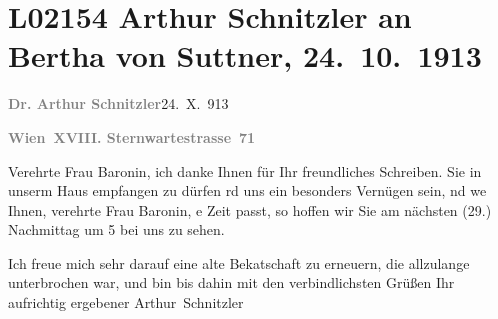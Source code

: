 

\section[Arthur Schnitzler an Bertha von Suttner, 24. 10. 1913]{L02154 Arthur Schnitzler an Bertha von Suttner, 24. 10. 1913}
\nopagebreak{}
\rehead{ }\normalsize\beginnumbering{}
\toendnotes[C]{\smallbreak\pagebreak[2]}
\toendnotes[C]{\smallbreak}
\pstart
           {\pb}\textcolor{gray}{\textbf{Dr. Arthur Schnitzler}}\hfill 24. X. 913\pend
           
\pstart
           \textcolor{gray}{\textbf{Wien XVIII. Sternwartestrasse 71}}\pend
           
\pstart{}Verehrte Frau Baronin,\pend\vspace{0.5em}
\pstart
           ich danke Ihnen für Ihr freundliches Schreiben. Sie in unserm Haus empfangen zu
               dürfen rd uns ein besonders Vernügen sein, nd we{\geminationn} Ihnen, verehrte Frau Baronin, e Zeit passt, so hoffen wir Sie {\pb}am \introOben{}nächsten\introOben{}{ }\label{K_L02154-1v}\label{K_L02154-1}{ }\introOben{}(29.)\introOben{} Nachmittag um 5 bei uns zu
               sehen.\pend
           
\pstart
           Ich freue mich sehr darauf eine alte Beka{\geminationn}tschaft zu
               erneuern, die allzulange unterbrochen war, und bin bis dahin mit den verbindlichsten
               Grüßen Ihr aufrichtig ergebener\pend
           \pstart \spacefill\mbox{Arthur Schnitzler}\pend{}\endnumbering{}  
      